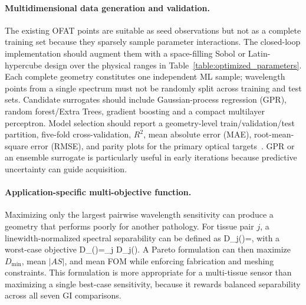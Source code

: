 \documentclass[5p,times,twocolumn]{elsarticle}
\let\oldequation\equation
\let\oldendequation\endequation
\renewenvironment{equation}
  {\linenomathNonumbers\oldequation}
  {\oldendequation\endlinenomath}
\begin{document}
\paragraph{Multidimensional data generation and validation.}
The existing OFAT points are suitable as seed observations but not as a complete training set because they sparsely sample parameter interactions. The closed-loop implementation should augment them with a space-filling Sobol or Latin-hypercube design over the physical ranges in Table~\ref{table:optimized_parameters}. Each complete geometry constitutes one independent ML sample; wavelength points from a single spectrum must not be randomly split across training and test sets. Candidate surrogates should include Gaussian-process regression (GPR), random forest/Extra Trees, gradient boosting and a compact multilayer perceptron. Model selection should report a geometry-level train/validation/test partition, five-fold cross-validation, $R^2$, mean absolute error (MAE), root-mean-square error (RMSE), and parity plots for the primary optical targets~\cite{Akter2025MLPCF,Khatun2025XAI,Khatun2026MLXAI}. GPR or an ensemble surrogate is particularly useful in early iterations because predictive uncertainty can guide acquisition.

\paragraph{Application-specific multi-objective function.}
Maximizing only the largest pairwise wavelength sensitivity can produce a geometry that performs poorly for another pathology. For tissue pair $j$, a linewidth-normalized spectral separability can be defined as
\begin{equation}
D_j()=,
\label{eq:separability}
\end{equation}
with a worst-case objective
\begin{equation}
D_{\min}()=\min_j D_j().
\label{eq:worstcase}
\end{equation}
A Pareto formulation can then maximize $D_{\min}$, mean $|AS|$, and mean FOM while enforcing fabrication and meshing constraints. This formulation is more appropriate for a multi-tissue sensor than maximizing a single best-case sensitivity, because it rewards balanced separability across all seven GI comparisons.
\end{document}
